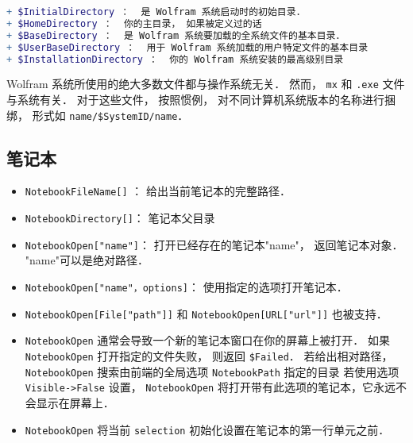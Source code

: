 \begin{lstlisting}[language=mathematica]
+ $InitialDirectory ：  是 Wolfram 系统启动时的初始目录．
+ $HomeDirectory ：  你的主目录， 如果被定义过的话
+ $BaseDirectory ：  是 Wolfram 系统要加载的全系统文件的基本目录．
+ $UserBaseDirectory ：  用于 Wolfram 系统加载的用户特定文件的基本目录
+ $InstallationDirectory ：  你的 Wolfram 系统安装的最高级别目录
\end{lstlisting}

Wolfram 系统所使用的绝大多数文件都与操作系统无关． 然而， \verb`mx` 和 \verb`.exe` 文件与系统有关．
对于这些文件， 按照惯例， 对不同计算机系统版本的名称进行捆绑， 形式如 \verb`name/$SystemID/name`．

\subsection{笔记本}

\begin{itemize}
\item \verb`NotebookFileName[]` ： 给出当前笔记本的完整路径．
\item \verb`NotebookDirectory[]`： 笔记本父目录
\end{itemize}


\begin{itemize}
\item \verb`NotebookOpen["name"]`：  打开已经存在的笔记本"name"， 返回笔记本对象． "name"可以是绝对路径．
\item \verb`NotebookOpen["name"，options]`： 使用指定的选项打开笔记本．
\item \verb`NotebookOpen[File["path"]]` 和 \verb`NotebookOpen[URL["url"]]` 也被支持．
\item \verb`NotebookOpen` 通常会导致一个新的笔记本窗口在你的屏幕上被打开．
如果 \verb`NotebookOpen` 打开指定的文件失败， 则返回 \verb`$Failed`．
若给出相对路径， \verb`NotebookOpen` 搜索由前端的全局选项 \verb`NotebookPath` 指定的目录
若使用选项 \verb`Visible->False` 设置， \verb`NotebookOpen` 将打开带有此选项的笔记本，它永远不会显示在屏幕上．
\item \verb`NotebookOpen` 将当前 \verb`selection` 初始化设置在笔记本的第一行单元之前．
\end{itemize}



